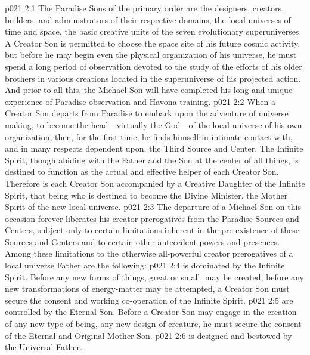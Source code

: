 \vs p021 2:1 The Paradise Sons of the primary order are the designers, creators, builders, and administrators of their respective domains, the local universes of time and space, the basic creative units of the seven evolutionary superuniverses. A Creator Son is permitted to choose the space site of his future cosmic activity, but before he may begin even the physical organization of his universe, he must spend a long period of observation devoted to the study of the efforts of his older brothers in various creations located in the superuniverse of his projected action. And prior to all this, the Michael Son will have completed his long and unique experience of Paradise observation and Havona training.
\pc \vs p021 2:2 When a Creator Son departs from Paradise to embark upon the adventure of universe making, to become the head---virtually the God---of the local universe of his own organization, then, for the first time, he finds himself in intimate contact with, and in many respects dependent upon, the Third Source and Center. The Infinite Spirit, though abiding with the Father and the Son at the center of all things, is destined to function as the actual and effective helper of each Creator Son. Therefore is each Creator Son accompanied by a Creative Daughter of the Infinite Spirit, that being who is destined to become the Divine Minister, the Mother Spirit of the new local universe.\plusone
\vs p021 2:3 The departure of a Michael Son on this occasion forever liberates his creator prerogatives from the Paradise Sources and Centers, subject only to certain limitations inherent in the pre\hyp{}existence of these Sources and Centers and to certain other antecedent powers and presences. Among these limitations to the otherwise all\hyp{}powerful creator prerogatives of a local universe Father are the following:
\pc \vs p021 2:4 \bibnobreakspace {} is dominated by the Infinite Spirit. Before any new forms of things, great or small, may be created, before any new transformations of energy\hyp{}matter may be attempted, a Creator Son must secure the consent and working co\hyp{}operation of the Infinite Spirit.
\vs p021 2:5 \bibnobreakspace {} are controlled by the Eternal Son. Before a Creator Son may engage in the creation of any new type of being, any new design of creature, he must secure the consent of the Eternal and Original Mother Son.
\vs p021 2:6 \bibnobreakspace {} is designed and bestowed by the Universal Father.
